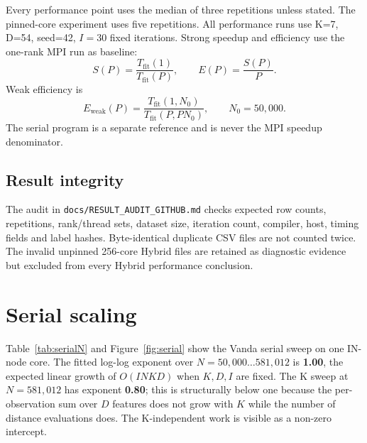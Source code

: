 \documentclass[10pt,a4paper]{article}
\newcommand{\code}[1]{\texttt{#1}}
\begin{document}
Every performance point uses the median of three repetitions unless stated.
The pinned-core experiment uses five repetitions. All performance runs use
K=7, D=54, seed=42, $I=30$ fixed iterations. Strong speedup and efficiency use
the one-rank MPI run as baseline:
\begin{equation}
S(P)=\frac{T_{\mathrm{fit}}(1)}{T_{\mathrm{fit}}(P)},\qquad
E(P)=\frac{S(P)}{P}.
\end{equation}
Weak efficiency is
\begin{equation}
E_{\mathrm{weak}}(P)=\frac{T_{\mathrm{fit}}(1,N_0)}
{T_{\mathrm{fit}}(P,P N_0)},\qquad N_0=50{,}000.
\end{equation}
The serial program is a separate reference and is never the MPI speedup
denominator.

\subsection{Result integrity}
The audit in \code{docs/RESULT\_AUDIT\_GITHUB.md} checks expected row counts,
repetitions, rank/thread sets, dataset size, iteration count, compiler, host,
timing fields and label hashes. Byte-identical duplicate CSV files are not
counted twice. The invalid unpinned 256-core Hybrid files are retained as
diagnostic evidence but excluded from every Hybrid performance conclusion.

\section{Serial scaling}
Table~\ref{tab:serialN} and Figure~\ref{fig:serial} show the Vanda serial
sweep on one IN-node core. The fitted log-log exponent over
$N=50{,}000\ldots581{,}012$ is \textbf{1.00}, the expected linear growth of
$O(I N K D)$ when $K,D,I$ are fixed. The K sweep at $N=581{,}012$ has exponent
\textbf{0.80}; this is structurally below one because the per-observation sum
over $D$ features does not grow with $K$ while the number of distance
evaluations does. The K-independent work is visible as a non-zero intercept.

\begin{table}[H]
\centering\small
\caption{Serial fit time on Vanda (one core, K=7, D=54, I=30, median of 3).}
\label{tab:serialN}

\end{table}

\begin{table}[H]
\centering\small
\caption{Serial K sweep at N=581,012 (one core, D=54, I=30, median of 3).}
\label{tab:serialK}

\end{table}
\end{document}
